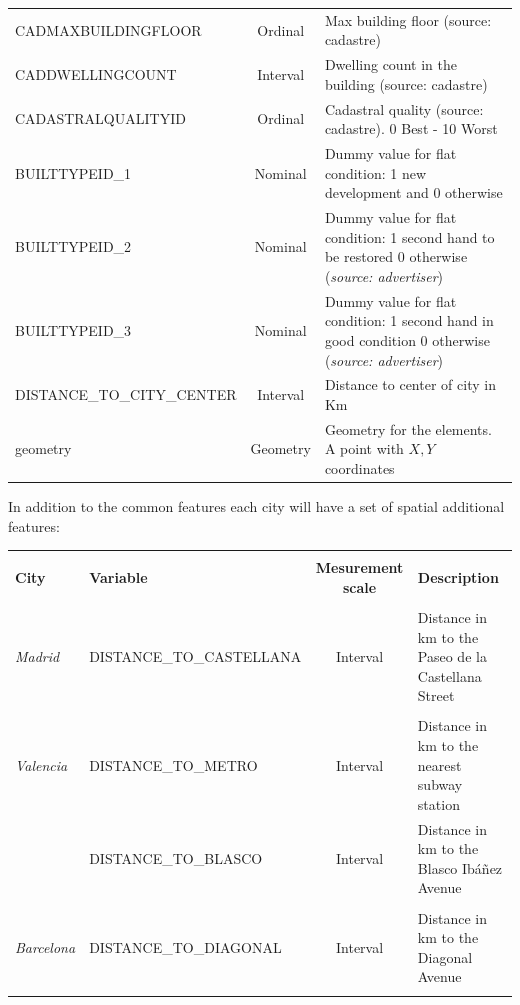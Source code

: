 \documentclass[times,final]{elsarticle}
\begin{document}
\begin{footnotesize}
\begin{longtable}{p{40mm} c p{63mm}}
CADMAXBUILDINGFLOOR & Ordinal & Max building floor (source: cadastre)\\
CADDWELLINGCOUNT & Interval & Dwelling count in the building (source: cadastre)\\
CADASTRALQUALITYID & Ordinal & Cadastral quality (source: cadastre). 0 Best - 10 Worst\\
BUILTTYPEID\_1 & Nominal & Dummy value for flat condition: 1 new development and 0 otherwise\\
BUILTTYPEID\_2 & Nominal & Dummy value for flat condition: 1 second hand to be restored 0 otherwise (\emph{source: advertiser})\\
BUILTTYPEID\_3 & Nominal & Dummy value for flat condition: 1 second hand in good condition 0 otherwise (\emph{source: advertiser})\\
DISTANCE\_TO\_CITY\_CENTER & Interval & Distance to center of city in Km\\
geometry & Geometry & Geometry for the elements. A point with $X,Y$ coordinates\\
\hline
\hline
\end{longtable}
\end{footnotesize}

In addition to the common features each city will have a set of spatial additional features:

\begin{footnotesize}
\begin{longtable}{l p{40mm} c p{63mm}}
\hline
\hline
& & &\\
\textbf{City} & \textbf{Variable} & \textbf{Mesurement scale} & \textbf{Description}\\
\hline
& & &\\
\emph{Madrid} & DISTANCE\_TO\_CASTELLANA & Interval & Distance in km to the Paseo de la Castellana Street \\
& & &\\
\emph{Valencia} & DISTANCE\_TO\_METRO & Interval & Distance in km to the nearest subway station \\
 & DISTANCE\_TO\_BLASCO & Interval & Distance in km to the Blasco Ibáñez Avenue \\
& & &\\
\emph{Barcelona} & DISTANCE\_TO\_DIAGONAL & Interval & Distance in km to the Diagonal Avenue \\
& & &\\
\hline
\hline
\hline
\end{longtable}
\end{footnotesize}
\end{document}
